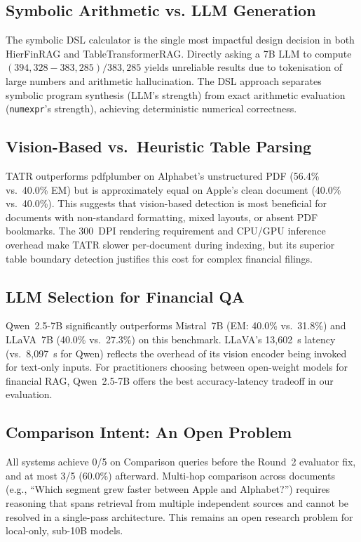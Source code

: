 \documentclass[conference]{IEEEtran}
\begin{document}
\subsection{Symbolic Arithmetic vs. LLM Generation}
The symbolic DSL calculator is the single most impactful design decision in both
HierFinRAG and TableTransformerRAG. Directly asking a 7B LLM to compute
$(394{,}328 - 383{,}285) / 383{,}285$ yields unreliable results due to
tokenisation of large numbers and arithmetic hallucination. The DSL approach
separates symbolic program synthesis (LLM's strength) from exact arithmetic
evaluation (\texttt{numexpr}'s strength), achieving deterministic numerical
correctness.

\subsection{Vision-Based vs.\ Heuristic Table Parsing}
TATR outperforms pdfplumber on Alphabet's unstructured PDF
(56.4\% vs.\ 40.0\% EM) but is approximately equal on Apple's clean document
(40.0\% vs.\ 40.0\%). This suggests that vision-based detection is most
beneficial for documents with non-standard formatting, mixed layouts, or absent
PDF bookmarks. The 300~DPI rendering requirement and CPU/GPU inference overhead
make TATR slower per-document during indexing, but its superior table boundary
detection justifies this cost for complex financial filings.

\subsection{LLM Selection for Financial QA}
Qwen~2.5-7B significantly outperforms Mistral~7B (EM: 40.0\% vs.\ 31.8\%) and
LLaVA~7B (40.0\% vs.\ 27.3\%) on this benchmark. LLaVA's 13,602~s latency
(vs.\ 8,097~s for Qwen) reflects the overhead of its vision encoder being
invoked for text-only inputs. For practitioners choosing between open-weight
models for financial RAG, Qwen~2.5-7B offers the best accuracy-latency tradeoff
in our evaluation.

\subsection{Comparison Intent: An Open Problem}
All systems achieve 0/5 on Comparison queries before the Round~2 evaluator fix,
and at most 3/5 (60.0\%) afterward. Multi-hop comparison across documents
(e.g., ``Which segment grew faster between Apple and Alphabet?'') requires
reasoning that spans retrieval from multiple independent sources and cannot be
resolved in a single-pass architecture. This remains an open research problem
for local-only, sub-10B models.
\end{document}
